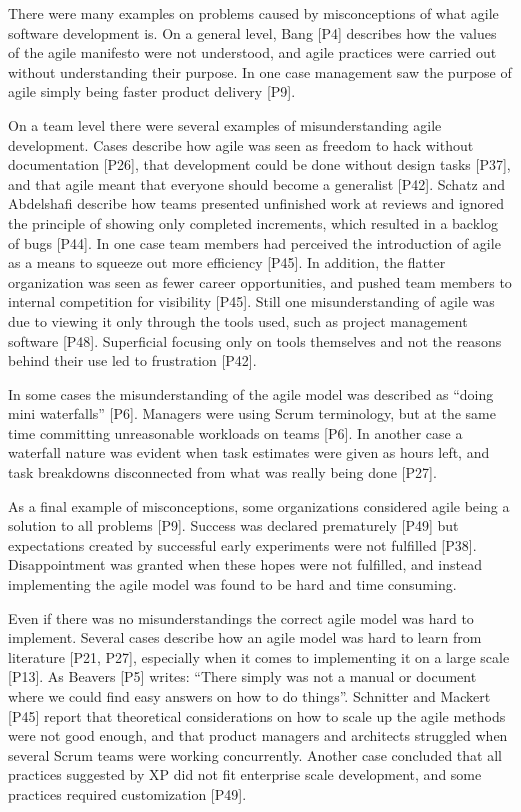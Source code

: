 
There were many examples on problems caused by misconceptions of what agile
software development is. On a general level, Bang [P4] describes how the values
of the agile manifesto were not understood, and agile practices were carried out
without understanding their purpose. In one case management saw the purpose of
agile simply being faster product delivery [P9].

On a team level there were several examples of misunderstanding agile
development. Cases describe how agile was seen as freedom to hack without
documentation [P26], that development could be done without design tasks [P37],
and that agile meant that everyone should become a generalist [P42]. Schatz and
Abdelshafi describe how teams presented unfinished work at reviews and ignored
the principle of showing only completed increments, which resulted in a backlog
of bugs [P44]. In one case team members had perceived the introduction of agile
as a means to squeeze out more efficiency [P45]. In addition, the flatter
organization was seen as fewer career opportunities, and pushed team members to
internal competition for visibility [P45].
Still one misunderstanding of agile was due to viewing it only through the tools
used, such as project management software [P48]. Superficial focusing only on
tools themselves and not the reasons behind their use led to frustration [P42].

In some cases the misunderstanding of the agile model was described as ``doing
mini waterfalls'' [P6]. Managers were using Scrum terminology, but at the same
time committing unreasonable workloads on teams [P6]. In another case a
waterfall nature was evident when task estimates were given as hours left, and
task breakdowns disconnected from what was really being done [P27].

As a final example of misconceptions, some organizations considered agile being
a solution to all problems [P9]. Success was declared prematurely [P49] but
expectations created by successful early experiments were not fulfilled [P38].
Disappointment was granted when these hopes were not fulfilled, and instead
implementing the agile model was found to be hard and time consuming.


Even if there was no misunderstandings the correct agile model was hard to
implement. Several cases describe how an agile model was hard to learn from
literature [P21, P27], especially when it comes to implementing it on a large
scale [P13]. As Beavers [P5] writes: ``There simply was not a manual or document
where we could find easy answers on how to do things''.
Schnitter and Mackert [P45] report that theoretical considerations on how to
scale up the agile methods were not good enough, and that product managers and
architects struggled when several Scrum teams were working concurrently.
Another case concluded that all practices suggested by XP did not fit enterprise
scale development, and some practices required customization [P49].


